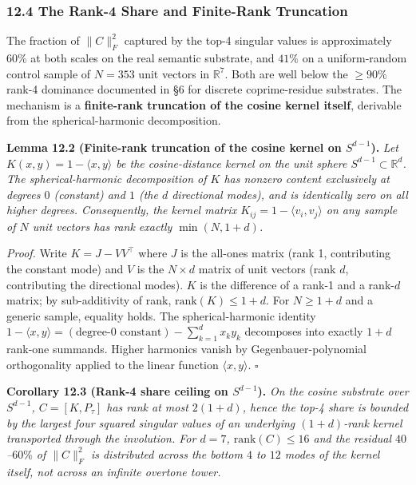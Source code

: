 \documentclass[
  11pt,
]{article}
\begin{document}
\subsubsection{12.4 The Rank-4 Share and Finite-Rank
Truncation}\label{the-rank-4-share-and-finite-rank-truncation}

The fraction of \(\|C\|_F^2\) captured by the top-4 singular values is
approximately \(60\%\) at both scales on the real semantic substrate,
and \(41\%\) on a uniform-random control sample of \(N = 353\) unit
vectors in \(\mathbb{R}^7\). Both are well below the \(\geq 90\%\)
rank-4 dominance documented in §6 for discrete coprime-residue
substrates. The mechanism is a \textbf{finite-rank truncation of the
cosine kernel itself}, derivable from the spherical-harmonic
decomposition.

\textbf{Lemma 12.2 (Finite-rank truncation of the cosine kernel on
\(S^{d-1}\)).} \emph{Let \(K(x, y) = 1 - \langle x, y\rangle\) be the
cosine-distance kernel on the unit sphere
\(S^{d-1} \subset \mathbb{R}^d\). The spherical-harmonic decomposition
of \(K\) has nonzero content exclusively at degrees \(0\) (constant) and
\(1\) (the \(d\) directional modes), and is identically zero on all
higher degrees. Consequently, the kernel matrix
\(K_{ij} = 1 - \langle v_i, v_j\rangle\) on any sample of \(N\) unit
vectors has rank exactly \(\min(N, 1 + d)\).}

\emph{Proof.} Write \(K = J - VV^\top\) where \(J\) is the all-ones
matrix (rank 1, contributing the constant mode) and \(V\) is the
\(N \times d\) matrix of unit vectors (rank \(d\), contributing the
directional modes). \(K\) is the difference of a rank-1 and a rank-\(d\)
matrix; by sub-additivity of rank, \(\mathrm{rank}(K) \leq 1 + d\). For
\(N \geq 1 + d\) and a generic sample, equality holds. The
spherical-harmonic identity
\(1 - \langle x, y\rangle = (\text{degree-0 constant}) - \sum_{k=1}^d x_k y_k\)
decomposes into exactly \(1 + d\) rank-one summands. Higher harmonics
vanish by Gegenbauer-polynomial orthogonality applied to the linear
function \(\langle x, y\rangle\). \(\square\)

\textbf{Corollary 12.3 (Rank-4 share ceiling on \(S^{d-1}\)).} \emph{On
the cosine substrate over \(S^{d-1}\), \(C = [K, P_\tau]\) has rank at
most \(2(1 + d)\), hence the top-4 share is bounded by the largest four
squared singular values of an underlying \((1+d)\)-rank kernel
transported through the involution. For \(d = 7\),
\(\mathrm{rank}(C) \leq 16\) and the residual \(40\)--\(60\%\) of
\(\|C\|_F^2\) is distributed across the bottom \(4\) to \(12\) modes of
the kernel itself, not across an infinite overtone tower.}
\end{document}
